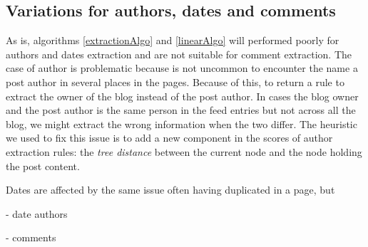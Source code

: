 \subsection{Variations for authors, dates and comments}
As is, algorithms \ref{extractionAlgo} and \ref{linearAlgo} will performed poorly for authors and dates extraction and are not suitable for comment extraction. The case of author is problematic because is not uncommon to encounter the name a post author in several places in the pages. Because of this, to return a rule to extract the owner of the blog instead of the post author. In cases the blog owner and the post author is the same person in the feed entries but not across all the blog, we might extract the wrong information when the two differ. The heuristic we used to fix this issue is to add a new component in the scores of author extraction rules: the \emph{tree distance} between the current node and the node holding the post content.

Dates are affected by the same issue often having duplicated in a page, but 
 


- date authors

- comments
